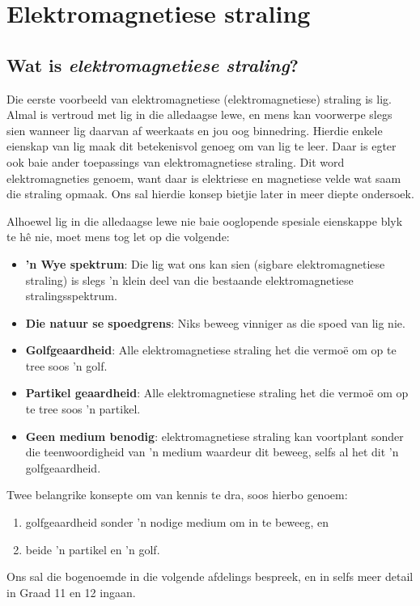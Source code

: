 \chapter{Elektromagnetiese stra\-ling}
    \setcounter{figure}{1}
    \setcounter{subfigure}{1}
    \label{459e2bef85baf867f5850bc8338cad3a}
         \section{Wat is \textsl{elektromagnetiese straling}?}
    \nopagebreak
Die eerste voorbeeld van elektromagnetiese (e\-lek\-tro\-mag\-ne\-tie\-se) straling is lig. Almal is vertroud met lig in die alledaagse lewe, en mens kan voorwerpe slegs sien wanneer lig daarvan af weerkaats en jou oog binnedring. Hierdie enkele eienskap van lig maak dit betekenisvol genoeg om van lig te leer. Daar is egter ook baie ander toepassings van e\-lek\-tro\-mag\-ne\-tie\-se straling. Dit word elektromagneties genoem, want daar is elektriese en magnetiese velde wat saam die straling opmaak. Ons sal hierdie konsep bietjie later in meer diepte ondersoek. 


Alhoewel lig in die alledaagse lewe nie baie ooglopende spesiale eienskappe blyk te h\^e nie, moet mens tog let op die volgende: 
\begin{itemize}
 \item \textbf{'n Wye spektrum}: Die lig wat ons kan sien (sigbare e\-lek\-tro\-mag\-ne\-tie\-se straling) is slegs 'n klein deel van die bestaande e\-lek\-tro\-mag\-ne\-tie\-se stralingsspektrum. 
 \item \textbf{Die natuur se spoedgrens}: Niks beweeg vinniger as die spoed van lig nie.  
 \item \textbf{Golfgeaardheid}: Alle e\-lek\-tro\-mag\-ne\-tie\-se straling het die vermo\"e om op te tree soos 'n golf. 
 \item \textbf{Partikel geaardheid}: Alle e\-lek\-tro\-mag\-ne\-tie\-se straling het die vermo\"e om op te tree soos 'n partikel.
 \item \textbf{Geen medium benodig}: e\-lek\-tro\-mag\-ne\-tie\-se straling kan voortplant sonder die teenwoordigheid van 'n medium waardeur dit beweeg, selfs al het dit 'n golfgeaardheid.
\end{itemize}

Twee belangrike konsepte om van kennis te dra, soos hierbo genoem:
\begin{enumerate}[noitemsep, label=\textbf{\arabic*}. ]
 \item golfgeaardheid sonder 'n nodige medium om in te beweeg, en 
 \item beide 'n partikel en 'n golf. 
\end{enumerate}
Ons sal die bogenoemde in die volgende afdelings bespreek, en in selfs meer detail in Graad 11 en 12 ingaan. 

